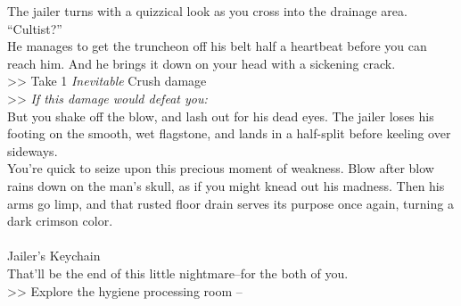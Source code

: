 The jailer turns with a quizzical look as you cross into the drainage area.\\
“Cultist?”\\

He manages to get the truncheon off his belt half a heartbeat before you can reach him. And he brings it down on your head with a sickening crack.\\
>> Take 1 \emph{Inevitable} Crush damage\\
>> \emph{If this damage would defeat you:} \\

But you shake off the blow, and lash out for his dead eyes. The jailer loses his footing on the smooth, wet flagstone, and lands in a half-split before keeling over sideways.\\

You’re quick to seize upon this precious moment of weakness. Blow after blow rains down on the man’s skull, as if you might knead out his madness. Then his arms go limp, and that rusted floor drain serves its purpose once again, turning a dark crimson color.\\
\\
 Jailer’s Keychain\\

That’ll be the end of this little nightmare--for the both of you.\\

>> Explore the hygiene processing room -- 